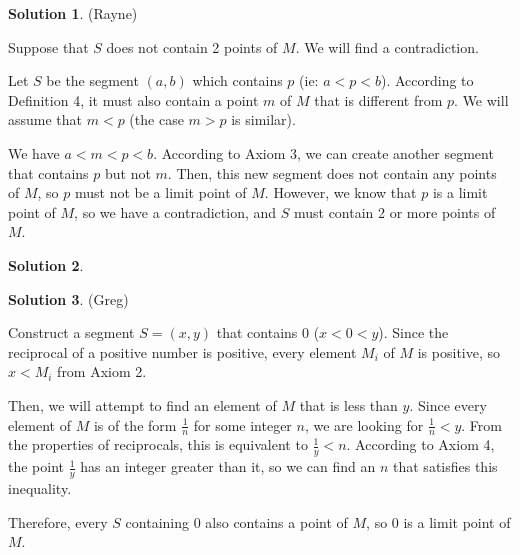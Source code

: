 \documentclass{article}
\theoremstyle{definition}
\newtheorem{solution}{Solution}
\begin{document}
\begin{solution} %
(Rayne)

Suppose that $S$ does not contain 2 points of $M$. We will find a contradiction.

Let $S$ be the segment $(a, b)$ which contains $p$ (ie: $a < p < b$).  
According to Definition 4, it must also contain a point $m$ of $M$ that is different from $p$.
We will assume that $m < p$ (the case $m > p$ is similar).

We have $a < m < p < b$. 
According to Axiom 3, we can create another segment that contains $p$ but not $m$.
Then, this new segment does not contain any points of $M$, so $p$ must not be a limit point of $M$. 
However, we know that $p$ is a limit point of $M$, so we have a contradiction, and $S$ must contain 2 or more points of $M$.
\end{solution}

\begin{solution} %
\end{solution}

\begin{solution} %
(Greg)

Construct a segment $S = (x, y)$ that contains $0$ ($x < 0 < y$).
Since the reciprocal of a positive number is positive, every element $M_i$ of $M$ is positive, so $x < M_i$ from Axiom 2.

Then, we will attempt to find an element of $M$ that is less than $y$.
Since every element of $M$ is of the form $\frac{1}{n}$ for some integer $n$, we are looking for $\frac{1}{n} < y$.
From the properties of reciprocals, this is equivalent to $\frac{1}{y} < n$.
According to Axiom 4, the point $\frac{1}{y}$ has an integer greater than it, so we can find an $n$ that satisfies this inequality.

Therefore, every $S$ containing $0$ also contains a point of $M$, so $0$ is a limit point of $M$.
\end{solution}
\end{document}
